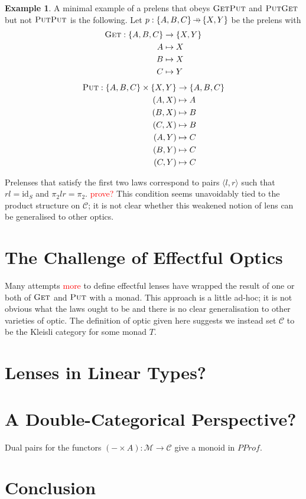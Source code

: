 \documentclass[11pt,a4paper]{article}
\theoremstyle{plain}
\theoremstyle{definition}
\newtheorem{example}[theorem]{Example}
\newcommand{\C}{\mathscr{C}}
\newcommand{\M}{\mathscr{M}}
\newcommand{\id}{\mathrm{id}}
\newcommand{\fget}{\textsc{Get}}
\newcommand{\fput}{\textsc{Put}}
\newcommand{\hto}{\ensuremath{\,\mathaccent\shortmid\rightarrow\,}}
\newcommand{\todo}[1]{\textcolor{red}{\small #1}}
\begin{document}
\begin{example}
A minimal example of a prelens that obeys $\fget\fput$ and $\fput\fget$ but not $\fput\fput$ is the following. Let $p : \{A,B,C\} \hto \{X, Y\}$ be the prelens with
\begin{align*}
\fget : \{A,B,C\} &\to \{X, Y\} \\
A &\mapsto X \\
B &\mapsto X \\
C &\mapsto Y 
\end{align*}
\begin{align*}
\fput : \{A,B,C\} \times \{X, Y\} &\to \{A,B,C\} \\
(A,X) &\mapsto A \\
(B,X) &\mapsto B \\
(C,X) &\mapsto B \\
(A,Y) &\mapsto C \\
(B,Y) &\mapsto C \\
(C,Y) &\mapsto C
\end{align*}
\end{example}

Prelenses that satisfy the first two laws correspond to pairs $\langle l, r \rangle$ such that $rl = \id_S$ and $\pi_2lr = \pi_2$. \todo{prove?} This condition seems unavoidably tied to the product structure on $\C$; it is not clear whether this weakened notion of lens can be generalised to other optics.

\section{The Challenge of Effectful Optics}

Many attempts \cite{ReflectionsOnMonadicLenses} \todo{more} to define effectful lenses have wrapped the result of one or both of $\fget$ and $\fput$ with a monad. This approach is a little ad-hoc; it is not obvious what the laws ought to be and there is no clear generalisation to other varieties of optic. The definition of optic given here suggests we instead set $\C$ to be the Kleisli category for some monad $T$.

\section{Lenses in Linear Types?}

\section{A Double-Categorical Perspective?}

Dual pairs for the functors $(- \times A) : \M \to \C$ give a monoid in $PProf$.


\section{Conclusion}



\end{document}
